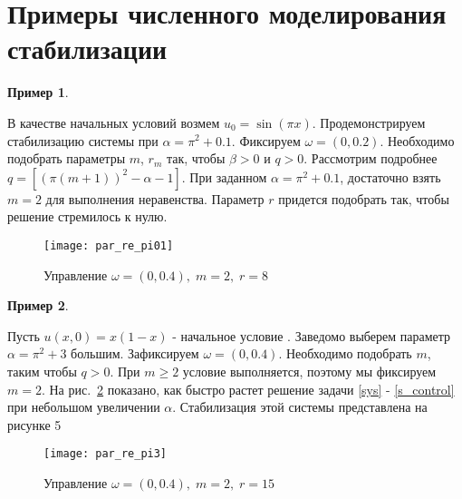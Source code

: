 \section{Примеры численного моделирования стабилизации}


\vspace{1em}

\newtheorem{exmp_st}{Пример}

\begin{exmp_st}
\end{exmp_st}

В качестве начальных условий возмем $u_0 = \sin(\pi x)$. Продемонстрируем 
стабилизацию системы при $\alpha = \pi^2 + 0.1$. Фиксируем $\omega = (0, 0.2)$. 
Необходимо подобрать параметры $m$, $r_m$ так, чтобы $\beta > 0$ и $q > 0$. 
Рассмотрим подробнее $q = [(\pi(m + 1))^2 - \alpha - 1]$. При заданном 
$\alpha = \pi^2 + 0.1$, достаточно взять $m = 2$ для выполнения неравенства. 
Параметр $r$ придется подобрать так, чтобы решение стремилось к нулю.


\begin{figure}[H]
    \centering
    \texttt{[image: par\_re\_pi01]}
    \caption{Управление $\omega = (0, 0.4),\; m = 2,\; r = 8$}
    \label{fig:fig03}
\end{figure}

\begin{exmp_st}
\end{exmp_st}

Пусть $u(x, 0) = x(1 - x)$ - начальное условие . Заведомо выберем параметр 
$\alpha = \pi^2 + 3$ большим. Зафиксируем $\omega = (0, 0.4)$. 
Необходимо подобрать $m$, таким чтобы $q > 0$. При $m \ge 2$ условие выполняется, 
поэтому мы фиксируем $m = 2$. На рис.~\ref{fig:fig04} показано, как быстро растет решение 
задачи \eqref{sys} - \eqref{s_control} при небольшом увеличении $\alpha$. 
Стабилизация этой системы представлена на рисунке 5

\begin{figure}[H]
    \centering
    \texttt{[image: par\_re\_pi3]}
    \caption{Управление $\omega = (0, 0.4),\; m = 2,\; r = 15$}
    \label{fig:fig04}
\end{figure}
